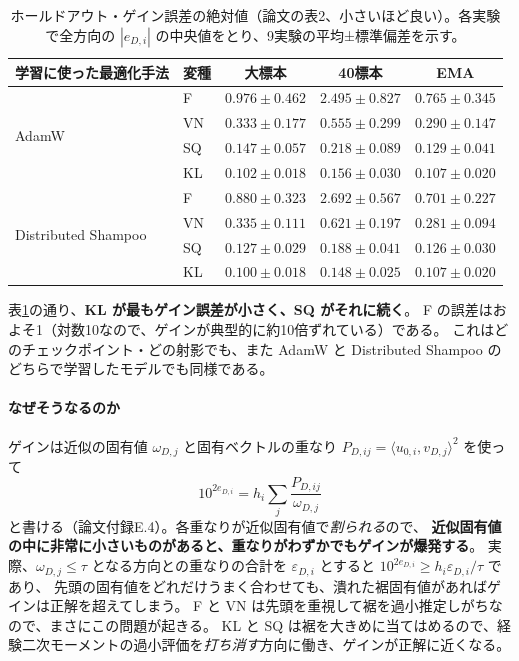 \documentclass[a4paper,11pt]{ltjsarticle}
\theoremstyle{definition}
\theoremstyle{plain}
\newcommand{\ip}[2]{\langle #1,#2\rangle}
\begin{document}
\begin{table}[t]
\centering
\caption{ホールドアウト・ゲイン誤差の絶対値（論文の表2、小さいほど良い）。各実験で全方向の $|e_{D,i}|$ の中央値をとり、9実験の平均±標準偏差を示す。}
\label{tab:gain}
\begin{tabular}{llccc}
\toprule
学習に使った最適化手法 & 変種 & 大標本 & 40標本 & EMA\\\midrule
\multirow{4}{*}{AdamW}
 & F  & $0.976\pm0.462$ & $2.495\pm0.827$ & $0.765\pm0.345$\\
 & VN & $0.333\pm0.177$ & $0.555\pm0.299$ & $0.290\pm0.147$\\
 & SQ & $0.147\pm0.057$ & $0.218\pm0.089$ & $0.129\pm0.041$\\
 & KL & $\mathbf{0.102\pm0.018}$ & $\mathbf{0.156\pm0.030}$ & $\mathbf{0.107\pm0.020}$\\\midrule
\multirow{4}{*}{Distributed Shampoo}
 & F  & $0.880\pm0.323$ & $2.692\pm0.567$ & $0.701\pm0.227$\\
 & VN & $0.335\pm0.111$ & $0.621\pm0.197$ & $0.281\pm0.094$\\
 & SQ & $0.127\pm0.029$ & $0.188\pm0.041$ & $0.126\pm0.030$\\
 & KL & $\mathbf{0.100\pm0.018}$ & $\mathbf{0.148\pm0.025}$ & $\mathbf{0.107\pm0.020}$\\
\bottomrule
\end{tabular}
\end{table}

表\ref{tab:gain}の通り、\textbf{KL が最もゲイン誤差が小さく、SQ がそれに続く}。
F の誤差はおよそ1（対数10なので、ゲインが典型的に約10倍ずれている）である。
これはどのチェックポイント・どの射影でも、また AdamW と Distributed Shampoo のどちらで学習したモデルでも同様である。

\paragraph{なぜそうなるのか}
ゲインは近似の固有値 $\omega_{D,j}$ と固有ベクトルの重なり $P_{D,ij} = \ip{u_{0,i}}{v_{D,j}}^2$ を使って
\begin{equation}
  10^{2e_{D,i}} = h_i\sum_j\frac{P_{D,ij}}{\omega_{D,j}}
\end{equation}
と書ける（論文付録E.4）。各重なりが近似固有値で\emph{割られる}ので、
\textbf{近似固有値の中に非常に小さいものがあると、重なりがわずかでもゲインが爆発する}。
実際、$\omega_{D,j}\le\tau$ となる方向との重なりの合計を $\varepsilon_{D,i}$ とすると $10^{2e_{D,i}}\ge h_i\varepsilon_{D,i}/\tau$ であり、
先頭の固有値をどれだけうまく合わせても、潰れた裾固有値があればゲインは正解を超えてしまう。
F と VN は先頭を重視して裾を過小推定しがちなので、まさにこの問題が起きる。
KL と SQ は裾を大きめに当てはめるので、経験二次モーメントの過小評価を\emph{打ち消す}方向に働き、ゲインが正解に近くなる。
\end{document}
